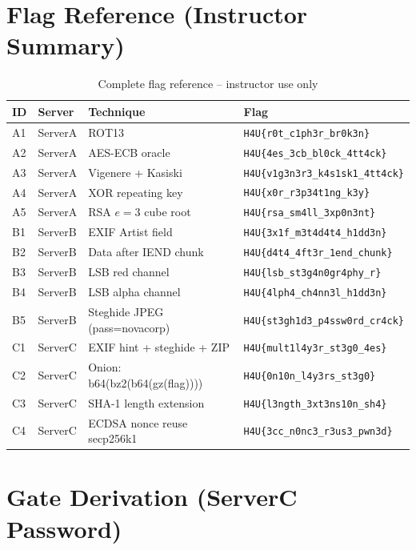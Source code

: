 \documentclass[a4paper, 12pt]{article}
\begin{document}
\section{Flag Reference (Instructor Summary)}

\begin{table}[H]
\centering
\begin{tabularx}{\textwidth}{llXl}
\toprule
\textbf{ID} & \textbf{Server} & \textbf{Technique} & \textbf{Flag} \\
\midrule
A1 & ServerA & ROT13 & \texttt{H4U\{r0t\_c1ph3r\_br0k3n\}} \\
A2 & ServerA & AES-ECB oracle & \texttt{H4U\{4es\_3cb\_bl0ck\_4tt4ck\}} \\
A3 & ServerA & Vigenere + Kasiski & \texttt{H4U\{v1g3n3r3\_k4s1sk1\_4tt4ck\}} \\
A4 & ServerA & XOR repeating key & \texttt{H4U\{x0r\_r3p34t1ng\_k3y\}} \\
A5 & ServerA & RSA $e=3$ cube root & \texttt{H4U\{rsa\_sm4ll\_3xp0n3nt\}} \\
\midrule
B1 & ServerB & EXIF Artist field & \texttt{H4U\{3x1f\_m3t4d4t4\_h1dd3n\}} \\
B2 & ServerB & Data after IEND chunk & \texttt{H4U\{d4t4\_4ft3r\_1end\_chunk\}} \\
B3 & ServerB & LSB red channel & \texttt{H4U\{lsb\_st3g4n0gr4phy\_r\}} \\
B4 & ServerB & LSB alpha channel & \texttt{H4U\{4lph4\_ch4nn3l\_h1dd3n\}} \\
B5 & ServerB & Steghide JPEG (pass=novacorp) & \texttt{H4U\{st3gh1d3\_p4ssw0rd\_cr4ck\}} \\
\midrule
C1 & ServerC & EXIF hint + steghide + ZIP & \texttt{H4U\{mult1l4y3r\_st3g0\_4es\}} \\
C2 & ServerC & Onion: b64(bz2(b64(gz(flag)))) & \texttt{H4U\{0n10n\_l4y3rs\_st3g0\}} \\
C3 & ServerC & SHA-1 length extension & \texttt{H4U\{l3ngth\_3xt3ns10n\_sh4\}} \\
C4 & ServerC & ECDSA nonce reuse secp256k1 & \texttt{H4U\{3cc\_n0nc3\_r3us3\_pwn3d\}} \\
\bottomrule
\end{tabularx}
\caption{Complete flag reference -- instructor use only}
\end{table}

\section{Gate Derivation (ServerC Password)}
\end{document}
